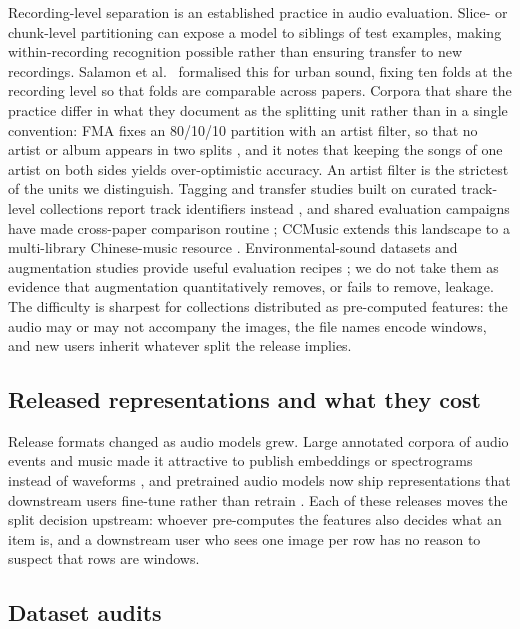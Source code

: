 Recording-level separation is an established practice in audio evaluation. Slice- or chunk-level
partitioning can expose a model to siblings of test examples, making within-recording recognition
possible rather than ensuring transfer to new recordings. Salamon et al.~\cite{salamon2014urbansound}
formalised this for urban sound, fixing ten folds at the recording level so that folds are
comparable across papers. Corpora that share the practice differ in what they document as the
splitting unit rather than in a single convention: FMA fixes an 80/10/10 partition with an
artist filter, so that no artist or album appears in two splits \citep{defferrard2016}, and it
notes that keeping the songs of one artist on both sides yields over-optimistic accuracy. An
artist filter is the strictest of the units we distinguish. Tagging and transfer studies built
on curated track-level collections report track identifiers instead
\citep{choi2017,lee2017,won2020}, and shared evaluation campaigns have made cross-paper
comparison routine \citep{downie2010mirex}; CCMusic extends this landscape to a multi-library
Chinese-music resource \citep{zhou2025ccmusic}.
Environmental-sound datasets and augmentation studies provide useful evaluation recipes
\citep{piczak2015,salamon2017augment}; we do not take them as evidence that augmentation
quantitatively removes, or fails to remove, leakage. The
difficulty is sharpest for collections distributed as pre-computed features: the audio may or may
not accompany the images, the file names encode windows, and new users inherit whatever split the
release implies.

\subsection{Released representations and what they cost}

Release formats changed as audio models grew. Large annotated corpora of audio events and music \citep{gemmeke2017audioset,engel2017} made it attractive to publish embeddings or spectrograms instead of waveforms \citep{hershey2017cnn,kong2020panns}, and pretrained audio models now ship representations that downstream users fine-tune rather than retrain \citep{elizalde2024clap,li2023}. Each of these releases moves the split decision upstream: whoever pre-computes the features also decides what an item is, and a downstream user who sees one image per row has no reason to suspect that rows are windows.

\subsection{Dataset audits}

